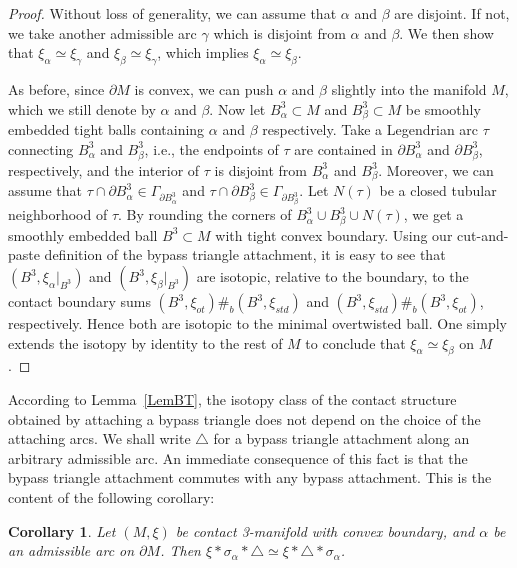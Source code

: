 \documentclass[12pt]{amsart}
\newtheorem{cor}[thm]{Corollary}
\theoremstyle{remark}
\newcommand{\bdry}{\partial}
\begin{document}
\begin{proof}
Without loss of generality, we can assume that $\alpha$ and $\beta$ are disjoint. If not, we take another admissible arc $\gamma$ which is disjoint from $\alpha$ and $\beta$. We then show that $\xi_\alpha \simeq \xi_\gamma$ and $\xi_\beta \simeq \xi_\gamma$, which implies $\xi_\alpha \simeq \xi_\beta$.

As before, since $\bdry M$ is convex, we can push $\alpha$ and $\beta$ slightly into the manifold $M$, which we still denote by $\alpha$ and $\beta$. Now let $B^3_\alpha\subset M$ and $B^3_\beta\subset M$ be smoothly embedded tight balls containing $\alpha$ and $\beta$ respectively. Take a Legendrian arc $\tau$ connecting $B^3_\alpha$ and $B^3_\beta$, i.e., the endpoints of $\tau$ are contained in $\bdry B^3_\alpha$ and $\bdry B^3_\beta$, respectively, and the interior of $\tau$ is disjoint from $B^3_\alpha$ and $B^3_\beta$. Moreover, we can assume that $\tau\cap\bdry B^3_\alpha \in \Gamma_{\bdry B^3_\alpha}$ and $\tau\cap\bdry B^3_\beta \in \Gamma_{\bdry B^3_\beta}$. Let $N(\tau)$ be a closed tubular neighborhood of $\tau$. By rounding the corners of $B^3_\alpha \cup B^3_\beta \cup N(\tau)$, we get a smoothly embedded ball $B^3\subset M$ with tight convex boundary. Using our cut-and-paste definition of the bypass triangle attachment, it is easy to see that $(B^3,\xi_\alpha|_{B^3})$ and $(B^3,\xi_\beta|_{B^3})$ are isotopic, relative to the boundary, to the contact boundary sums $(B^3,\xi_{ot})\#_b(B^3,\xi_{std})$ and $(B^3,\xi_{std})\#_b(B^3,\xi_{ot})$, respectively. Hence both are isotopic to the minimal overtwisted ball. One simply extends the isotopy by identity to the rest of $M$ to conclude that $\xi_\alpha\simeq\xi_\beta$ on $M$.
\end{proof}

According to Lemma~\ref{LemBT}, the isotopy class of the contact structure obtained by attaching a bypass triangle does not depend on the choice of the attaching arcs. We shall write $\triangle$ for a bypass triangle attachment along an arbitrary admissible arc. An immediate consequence of this fact is that the bypass triangle attachment commutes with any bypass attachment. This is the content of the following corollary:

\begin{cor} \label{Commutativity}
Let $(M,\xi)$ be contact 3-manifold with convex boundary, and $\alpha$ be an admissible arc on $\bdry M$. Then $\xi\ast\sigma_\alpha \ast \triangle \simeq \xi\ast\triangle \ast \sigma_\alpha$.
\end{cor}
\end{document}

